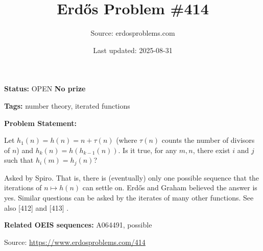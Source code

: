\documentclass{article}
\title{Erd\H{o}s Problem \#414}
\date{Last updated: 2025-08-31}
\author{Source: erdosproblems.com}
\begin{document}
\maketitle

\noindent\textbf{Status:} OPEN \quad \textbf{No prize}

\noindent\textbf{Tags:} number theory, iterated functions

\medskip

\noindent\textbf{Problem Statement:}

Let $h_1(n)=h(n)=n+\tau(n)$ (where $\tau(n)$ counts the number of divisors of $n$) and $h_k(n)=h(h_{k-1}(n))$. Is it true, for any $m,n$, there exist $i$ and $j$ such that $h_i(m)=h_j(n)$?




Asked by Spiro. That is, there is (eventually) only one possible sequence that the iterations of $n\mapsto h(n)$ can settle on. Erd\H{o}s and Graham believed the answer is yes. Similar questions can be asked by the iterates of many other functions. See also [412] and [413] .

\noindent\textbf{Related OEIS sequences:} A064491, possible


\bigskip
\noindent\small{Source: \url{https://www.erdosproblems.com/414}}
\end{document}
